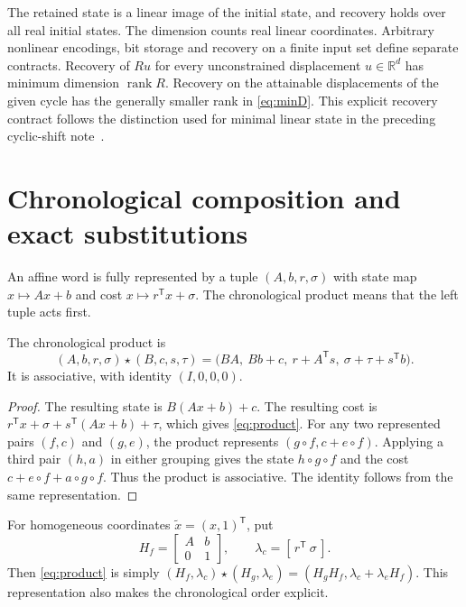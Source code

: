 \documentclass[11pt,a4paper]{article}
\theoremstyle{definition}\newtheorem{definition}[theorem]{Definition}\newtheorem{example}[theorem]{Example}\newtheorem{remark}[theorem]{Remark}
\DeclareMathOperator{\rank}{rank}\DeclareMathOperator{\im}{im}\DeclareMathOperator{\spanop}{span}\DeclareMathOperator{\diag}{diag}
\newcommand{\R}{\mathbb R}\newcommand{\Q}{\mathbb Q}\newcommand{\Z}{\mathbb Z}\newcommand{\N}{\mathbb N}\newcommand{\id}{\mathrm{id}}
\begin{document}
The retained state is a linear image of the initial state, and recovery
holds over all real initial states. The dimension counts real linear
coordinates. Arbitrary nonlinear encodings, bit storage and recovery
on a finite input set define separate contracts. Recovery of $Ru$
for every unconstrained displacement $u\in\R^d$ has minimum
dimension $\rank R$. Recovery on the attainable displacements of
the given cycle has the generally smaller rank in \eqref{eq:minD}.
This explicit recovery contract follows the distinction used for
minimal linear state in the preceding cyclic-shift note~\cite{cyclic}.

\section{Chronological composition and exact substitutions}
An affine word is fully represented by a tuple
$(A,b,r,\sigma)$ with state map $x\mapsto Ax+b$ and cost
$x\mapsto r^{\mathsf T}x+\sigma$.
The chronological product means that the left tuple acts first.

\begin{proposition}\label{prop:compose}
The chronological product is
\begin{equation}\label{eq:product}
 (A,b,r,\sigma)\star(B,c,s,\tau)
 =\bigl(BA,\ Bb+c,\ r+A^{\mathsf T}s,\
             \sigma+\tau+s^{\mathsf T}b\bigr).
\end{equation}
It is associative, with identity $(I,0,0,0)$.
\end{proposition}
\begin{proof}
The resulting state is $B(Ax+b)+c$. The resulting cost is
$r^{\mathsf T}x+\sigma+s^{\mathsf T}(Ax+b)+\tau$, which gives
\eqref{eq:product}. For any two represented pairs $(f,c)$ and $(g,e)$,
the product represents $(g\circ f,c+e\circ f)$. Applying a third pair
$(h,a)$ in either grouping gives the state $h\circ g\circ f$ and the
cost $c+e\circ f+a\circ g\circ f$. Thus the product is associative.
The identity follows from the same representation.
\end{proof}

For homogeneous coordinates $\widetilde x=(x,1)^{\mathsf T}$, put
\[
 H_f=\begin{bmatrix}A&b\\0&1\end{bmatrix},
 \qquad \lambda_c=[\,r^{\mathsf T}\ \sigma\,].
\]
Then \eqref{eq:product} is simply
$(H_f,\lambda_c)\star(H_g,\lambda_e)
=(H_gH_f,\lambda_c+\lambda_eH_f)$.
This representation also makes the chronological order explicit.
\end{document}
